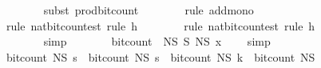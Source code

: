 \begin{isabellebody}
\ \ \ \ \ \ \isamarkupfalse%
\ {\isacharparenleft}{\kern0pt}subst\ prod{\isacharunderscore}{\kern0pt}bit{\isacharunderscore}{\kern0pt}count{\isacharunderscore}{\kern0pt}{}{\isacharparenright}{\kern0pt}\isanewline
\ \ \ \ \ \ \isamarkupfalse%
\ {\isacharparenleft}{\kern0pt}rule\ add{\isacharunderscore}{\kern0pt}mono{\isacharparenright}{\kern0pt}\isanewline
\ \ \ \ \ \ \ \isamarkupfalse%
\ {\isacharparenleft}{\kern0pt}rule\ nat{\isacharunderscore}{\kern0pt}bit{\isacharunderscore}{\kern0pt}count{\isacharunderscore}{\kern0pt}est{\isacharcomma}{\kern0pt}\ rule\ h{\isacharunderscore}{\kern0pt}{}{\isacharparenright}{\kern0pt}\isanewline
\ \ \ \ \ \ \isamarkupfalse%
\ {\isacharparenleft}{\kern0pt}rule\ nat{\isacharunderscore}{\kern0pt}bit{\isacharunderscore}{\kern0pt}count{\isacharunderscore}{\kern0pt}est{\isacharcomma}{\kern0pt}\ rule\ h{\isacharunderscore}{\kern0pt}{}{\isacharparenright}{\kern0pt}\isanewline
\ \ \ \ \isamarkupfalse%
\ \isamarkupfalse%
\ {\isachardoublequoteopen}{\isachardot}{\kern0pt}{\isachardot}{\kern0pt}{\isachardot}{\kern0pt}\ {\isacharequal}{\kern0pt}\ {}{\isachardoublequoteclose}\isanewline
\ \ \ \ \ \ \isamarkupfalse%
\ simp\isanewline
\ \ \ \ \isamarkupfalse%
\ \isamarkupfalse%
\ {\isachardoublequoteopen}bit{\isacharunderscore}{\kern0pt}count\ \ {\isacharparenleft}{\kern0pt}{\isacharparenleft}{\kern0pt}N\isactrlsub S\ {\isasymtimes}\isactrlsub S\ N\isactrlsub S{\isacharparenright}{\kern0pt}\ x{\isacharparenright}{\kern0pt}\ {\isasymle}\ {}{\isachardoublequoteclose}\ \isamarkupfalse%
\ simp\isanewline
\ \ \isamarkupfalse%
\isanewline
\isanewline
\ \ \isamarkupfalse%
\ {\isachardoublequoteopen}bit{\isacharunderscore}{\kern0pt}count\ {\isacharparenleft}{\kern0pt}N\isactrlsub S\ s\ {\isacharplus}{\kern0pt}\ bit{\isacharunderscore}{\kern0pt}count\ {\isacharparenleft}{\kern0pt}N\isactrlsub S\ s\ {\isacharplus}{\kern0pt}\ bit{\isacharunderscore}{\kern0pt}count\ {\isacharparenleft}{\kern0pt}N\isactrlsub S\ k{\isacharparenright}{\kern0pt}\ {\isacharplus}{\kern0pt}\ bit{\isacharunderscore}{\kern0pt}count\ {\isacharparenleft}{\kern0pt}N\isactrlsub S\ {}{\isacharparenright}{\kern0pt}\ {\isacharplus}{\kern0pt}\ \isanewline

\end{isabellebody}
